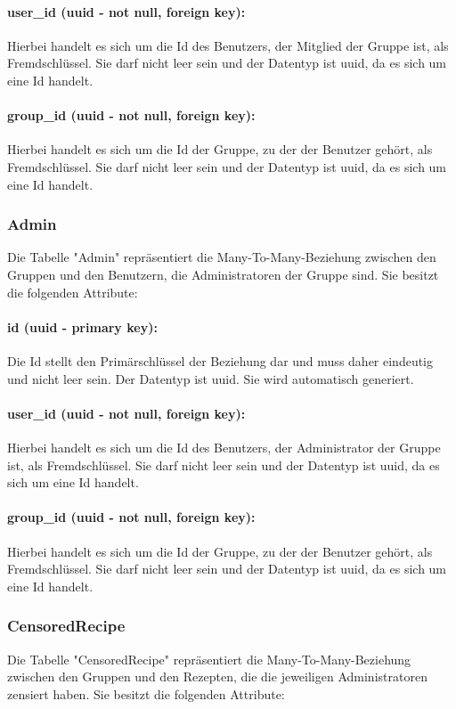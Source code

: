 \documentclass[parskip=full]{scrartcl}
\begin{document}
\paragraph{user\_id (uuid - not null, foreign key):} Hierbei handelt es sich um die Id des Benutzers, der Mitglied der Gruppe ist, als Fremdschlüssel. Sie darf nicht leer sein und der Datentyp ist \Gls{uuid}, da es sich um eine Id handelt.
\paragraph{group\_id (uuid - not null, foreign key):} Hierbei handelt es sich um die Id der Gruppe, zu der der Benutzer gehört, als Fremdschlüssel. Sie darf nicht leer sein und der Datentyp ist \Gls{uuid}, da es sich um eine Id handelt.
\newpage
\subsubsection{Admin}
Die Tabelle "Admin" repräsentiert die Many-To-Many-Beziehung zwischen den Gruppen und den Benutzern, die Administratoren der Gruppe sind. Sie besitzt die folgenden Attribute:
\paragraph{id (uuid - primary key):} Die Id stellt den Primärschlüssel der Beziehung dar und muss daher eindeutig und nicht leer sein. Der Datentyp ist \Gls{uuid}. Sie wird automatisch generiert.
\paragraph{user\_id (uuid - not null, foreign key):} Hierbei handelt es sich um die Id des Benutzers, der Administrator der Gruppe ist, als Fremdschlüssel. Sie darf nicht leer sein und der Datentyp ist \Gls{uuid}, da es sich um eine Id handelt.
\paragraph{group\_id (uuid - not null, foreign key):} Hierbei handelt es sich um die Id der Gruppe, zu der der Benutzer gehört, als Fremdschlüssel. Sie darf nicht leer sein und der Datentyp ist \Gls{uuid}, da es sich um eine Id handelt.
\newpage
\subsubsection{CensoredRecipe}
Die Tabelle "CensoredRecipe" repräsentiert die Many-To-Many-Beziehung zwischen den Gruppen und den Rezepten, die die jeweiligen Administratoren zensiert haben. Sie besitzt die folgenden Attribute:
\end{document}
